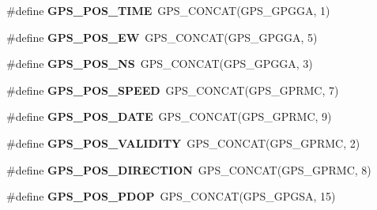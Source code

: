 \begin{DoxyCompactItemize}
\item 
\hypertarget{group___t_m___g_p_s___macros_ga930835327feb841bd66b24506719fa08}{}\#define {\bfseries G\+P\+S\+\_\+\+P\+O\+S\+\_\+\+T\+I\+M\+E}~G\+P\+S\+\_\+\+C\+O\+N\+C\+A\+T(G\+P\+S\+\_\+\+G\+P\+G\+G\+A, 1)\label{group___t_m___g_p_s___macros_ga930835327feb841bd66b24506719fa08}

\item 
\hypertarget{group___t_m___g_p_s___macros_ga88670fe57059646ec87bcb3b743a15df}{}\#define {\bfseries G\+P\+S\+\_\+\+P\+O\+S\+\_\+\+E\+W}~G\+P\+S\+\_\+\+C\+O\+N\+C\+A\+T(G\+P\+S\+\_\+\+G\+P\+G\+G\+A, 5)\label{group___t_m___g_p_s___macros_ga88670fe57059646ec87bcb3b743a15df}

\item 
\hypertarget{group___t_m___g_p_s___macros_ga3c89835a16da1a65839c1087379b480a}{}\#define {\bfseries G\+P\+S\+\_\+\+P\+O\+S\+\_\+\+N\+S}~G\+P\+S\+\_\+\+C\+O\+N\+C\+A\+T(G\+P\+S\+\_\+\+G\+P\+G\+G\+A, 3)\label{group___t_m___g_p_s___macros_ga3c89835a16da1a65839c1087379b480a}

\item 
\hypertarget{group___t_m___g_p_s___macros_ga2251034186a93272cf611ef1cd245f09}{}\#define {\bfseries G\+P\+S\+\_\+\+P\+O\+S\+\_\+\+S\+P\+E\+E\+D}~G\+P\+S\+\_\+\+C\+O\+N\+C\+A\+T(G\+P\+S\+\_\+\+G\+P\+R\+M\+C, 7)\label{group___t_m___g_p_s___macros_ga2251034186a93272cf611ef1cd245f09}

\item 
\hypertarget{group___t_m___g_p_s___macros_ga166688f16fbb8d7b3833820901706dfe}{}\#define {\bfseries G\+P\+S\+\_\+\+P\+O\+S\+\_\+\+D\+A\+T\+E}~G\+P\+S\+\_\+\+C\+O\+N\+C\+A\+T(G\+P\+S\+\_\+\+G\+P\+R\+M\+C, 9)\label{group___t_m___g_p_s___macros_ga166688f16fbb8d7b3833820901706dfe}

\item 
\hypertarget{group___t_m___g_p_s___macros_ga84b414fde2a0afca6bec07dcf73cb9d8}{}\#define {\bfseries G\+P\+S\+\_\+\+P\+O\+S\+\_\+\+V\+A\+L\+I\+D\+I\+T\+Y}~G\+P\+S\+\_\+\+C\+O\+N\+C\+A\+T(G\+P\+S\+\_\+\+G\+P\+R\+M\+C, 2)\label{group___t_m___g_p_s___macros_ga84b414fde2a0afca6bec07dcf73cb9d8}

\item 
\hypertarget{group___t_m___g_p_s___macros_gae8c6b709013b3a82b7cb163d8f90d363}{}\#define {\bfseries G\+P\+S\+\_\+\+P\+O\+S\+\_\+\+D\+I\+R\+E\+C\+T\+I\+O\+N}~G\+P\+S\+\_\+\+C\+O\+N\+C\+A\+T(G\+P\+S\+\_\+\+G\+P\+R\+M\+C, 8)\label{group___t_m___g_p_s___macros_gae8c6b709013b3a82b7cb163d8f90d363}

\item 
\hypertarget{group___t_m___g_p_s___macros_ga204c7d13c52622f52a7e2851f66deeff}{}\#define {\bfseries G\+P\+S\+\_\+\+P\+O\+S\+\_\+\+P\+D\+O\+P}~G\+P\+S\+\_\+\+C\+O\+N\+C\+A\+T(G\+P\+S\+\_\+\+G\+P\+G\+S\+A, 15)\label{group___t_m___g_p_s___macros_ga204c7d13c52622f52a7e2851f66deeff}


\end{DoxyCompactItemize}
